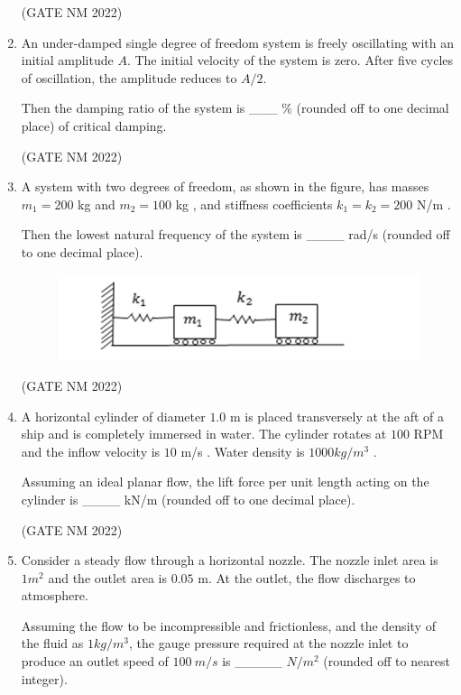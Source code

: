\documentclass[journal,12pt,onecolumn]{IEEEtran}
\theoremstyle{remark}
\begin{document}
\begin{enumerate}
\hfill(GATE NM 2022)



\item
An under-damped single degree of freedom system is freely oscillating with an initial amplitude $A$. The initial velocity of the system is zero. After five cycles of oscillation, the amplitude reduces to $A/2$.  

Then the damping ratio of the system is \_\_\_ \% (rounded off to one decimal place) of critical damping.


\hfill(GATE NM 2022)





\item 
A system with two degrees of freedom, as shown in the figure, has masses  
$m_1 = 200$ kg and $m_2 = 100$ kg , and stiffness coefficients  
$k_1 = k_2 = 200$ N/m .  

Then the lowest natural frequency of the system is  
\_\_\_\_  rad/s  (rounded off to one decimal place).


 \begin{figure}[h]
	 \centering
	 \includegraphics[width=0.5\columnwidth]{fig13}
	 \caption{}
	 \label{fig:placeholder}
 \end{figure}

 \hfill(GATE NM 2022)

\item   
A horizontal cylinder of diameter $1.0$ m  is placed transversely at the aft of a ship and is completely immersed in water.  
The cylinder rotates at $100$ RPM  and the inflow velocity is $10$ m/s . Water density is $1000 kg/m^3 $ .  

Assuming an ideal planar flow, the lift force per unit length acting on the cylinder is  
\_\_\_\_  kN/m (rounded off to one decimal place).


\hfill(GATE NM 2022)



\item  
Consider a steady flow through a horizontal nozzle.  
The nozzle inlet area is $1 m^2 $  and the outlet area is $0.05$ m.  
At the outlet, the flow discharges to atmosphere.  

Assuming the flow to be incompressible and frictionless, and the density of the fluid as  
$1  kg/m^3$, the gauge pressure required at the nozzle inlet to produce an outlet speed  
of $100\ m/s $ is \_\_\_\_\_ $  N/m^2 $ (rounded off to nearest integer).


\end{enumerate}
\end{document}
